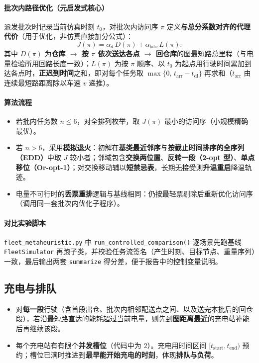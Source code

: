 \documentclass[UTF8,a4paper]{ctexart}
\begin{document}
\paragraph{批次内路径优化（元启发式核心）}
派发批次时记录当前仿真时刻 $t_0$，对批次内访问序 $\pi$ 定义\textbf{与总分系数对齐的代理代价}（用于优化，非仿真直接加分公式）：
\begin{equation}
  J(\pi) = \alpha_{d}\, D(\pi) + \alpha_{\mathrm{late}}\, L(\pi).
\end{equation}
其中 $D(\pi)$ 为\textbf{仓库 $\to$ 按 $\pi$ 依次送达各点 $\to$ 回仓库}的图最短路总里程（与电量检验所用回路长度一致）；$L(\pi)$ 为按 $\pi$ 顺序、以 $t_0$ 为起点用行驶时间累加到达各点时，\textbf{正迟到时间}之和，即对每个任务取 $\max\{0,\,t_{\mathrm{arr}}-t_{\mathrm{dl}}\}$ 再求和（$t_{\mathrm{arr}}$ 由连续最短路距离除以车速 $v$ 递推）。

\paragraph{算法流程}
\begin{itemize}
  \item 若批内任务数 $n\le 6$，对全排列枚举，取 $J(\pi)$ 最小的访问序（小规模精确最优）。
  \item 若 $n>6$，采用\textbf{模拟退火}：初解在\textbf{基类最近邻序}与\textbf{按截止时间排序的全序列（EDD）}中取 $J$ 较小者；邻域包含\textbf{交换两位置}、\textbf{反转一段（2-opt 型）}、\textbf{单点移位（Or-opt-1）}；对交换移动辅以\textbf{短禁忌表}，长期无接受则\textbf{升温重启}降温轨迹。
  \item 电量不可行时的\textbf{丢票重排}逻辑与基线相同：仍按最轻票剔除后重新优化访问序（调用同一套批次内优化子程序）。
\end{itemize}

\paragraph{对比实验脚本}
\texttt{fleet\_metaheuristic.py} 中 \texttt{run\_controlled\_comparison()} 逐场景先跑基线 \texttt{FleetSimulator} 再跑子类，并校验任务流签名（产生时刻、目标节点、重量序列）一致，最后输出两套 \texttt{summarize} 得分差，便于报告中的控制变量说明。

\subsection{充电与排队}
\begin{itemize}
  \item 对\textbf{每一段}行驶（含首段出仓、批次内相邻配送点之间、以及送完本批后的回仓段），若沿最短路直达的能耗超过当前电量，则先到\textbf{图距离最近}的充电站补能后再继续该段。
  \item 每个充电站有有限个\textbf{并发槽位}（代码中为 $2$）。充电用时间区间 $[t_{\mathrm{start}},t_{\mathrm{end}})$ 预约；槽位已满时推进到\textbf{最早能开始充电的时刻}，体现\textbf{排队与负荷}。
\end{itemize}
\end{document}
